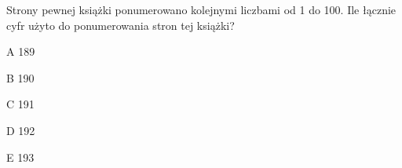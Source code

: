 \begin{tresc}
Strony pewnej książki ponumerowano kolejnymi liczbami od 1 do 100. Ile łącznie cyfr użyto do ponumerowania stron tej książki?
\end{tresc}
\begin{wariant}{A} 189 \end{wariant}
\begin{wariant}{B} 190 \end{wariant}
\begin{wariant}{C} 191 \end{wariant}
\begin{wariant}{D} 192 \end{wariant}
\begin{wariant}{E} 193 \end{wariant}
